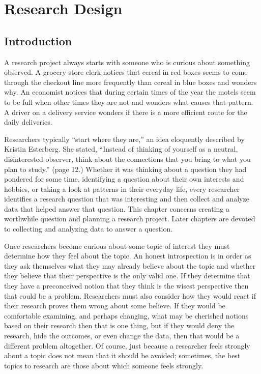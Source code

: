 \chapter{Research Design}\label{04:design}

\section{Introduction}

A research project always starts with someone who is curious about something observed. A grocery store clerk notices that cereal in red boxes seems to come through the checkout line more frequently than cereal in blue boxes and wonders why. An economist notices that during certain times of the year the motels seem to be full when other times they are not and wonders what causes that pattern. A driver on a delivery service wonders if there is a more efficient route for the daily deliveries.

Researchers typically ``start where they are,'' an idea eloquently described by Kristin Esterberg\cite{esterberg2002qualitative}. She stated, ``Instead of thinking of yourself as a neutral, disinterested observer, think about the connections that you bring to what you plan to study.'' (page 12.) Whether it was thinking about a question they had pondered for some time, identifying a question about their own interests and hobbies, or taking a look at patterns in their everyday life, every researcher identifies a research question that was interesting and then collect and analyze data that helped answer that question. This chapter concerns creating a worthwhile question and planning a research project. Later chapters are devoted to collecting and analyzing data to answer a question.

Once researchers become curious about some topic of interest they must determine how they feel about the topic. An honest introspection is in order as they ask themselves what they may already believe about the topic and whether they believe that their perspective is the only valid one. If they determine that they have a preconceived notion that they think is the wisest perspective then that could be a problem. Researchers must also consider how they would react if their research proves them wrong about some believe. If they would be comfortable examining, and perhaps changing, what may be cherished notions based on their research then that is one thing, but if they would deny the research, hide the outcomes, or even change the data, then that would be a different problem altogether. Of course, just because a researcher feels strongly about a topic does not mean that it should be avoided; sometimes, the best topics to research are those about which someone feels strongly. 

